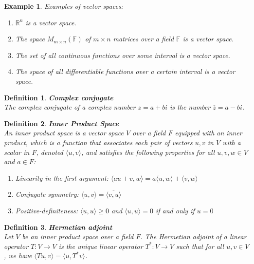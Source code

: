 \documentclass[11pt]{book} %
\newtheorem{definition}{Definition}[section]
\newtheorem*{example*}{Example}
\begin{document}
\begin{example*}
Examples of vector spaces:
\begin{enumerate}
\item \( \mathbb{R}^n \) is a vector space.
\item The space \( M_{m \times n}(\mathbb{F}) \) of \( m \times n \) matrices over a field \(\mathbb{F}\) is a vector space.
\item The set of all continuous functions over some interval is a vector space.
\item The space of all differentiable functions over a certain interval is a vector space.
\end{enumerate}
\end{example*}

\begin{definition}{\textbf{Complex conjugate}} \\
    The complex conjugate of a complex number \( z = a + bi \) is the number \( \overline{z} = a - bi \).
\end{definition}

\begin{definition}{\textbf{Inner Product Space}} \\
    An inner product space is a vector space \( V \) over a field \( F \) equipped with an inner product, which is a function that associates each pair of vectors \( u, v \) in \( V \) with a scalar in \( F \), denoted \( \langle u, v \rangle \), and satisfies the following properties for all \( u, v, w \in V \) and \( a \in F \):
    \begin{enumerate}
        \item Linearity in the first argument: \( \langle au + v, w \rangle = a \langle u, w \rangle + \langle v, w \rangle \)
        \item Conjugate symmetry: \( \langle u, v \rangle = \overline{\langle v, u \rangle} \)
        \item Positive-definiteness: \( \langle u, u \rangle \geq 0 \) and \( \langle u, u \rangle = 0 \) if and only if \( u = 0 \)
    \end{enumerate}
\end{definition}

\begin{definition}{\textbf{Hermetian adjoint}} \\
    Let \( V \) be an inner product space over a field \( F \). 
    The Hermetian adjoint of a linear operator \( T: V \to V \) is the unique linear operator \( T^*: V \to V \) such that for all \( u, v \in V \), we have \( \langle Tu, v \rangle = \langle u, T^*v \rangle \).
    
\end{definition}
\end{document}
